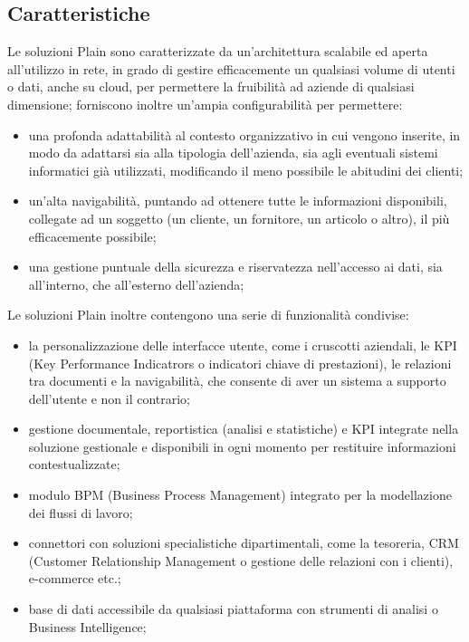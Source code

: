 \subsection{Caratteristiche}
Le soluzioni Plain sono caratterizzate da un'architettura scalabile ed aperta all'utilizzo in rete, in grado di gestire efficacemente un qualsiasi volume di utenti o dati, anche su cloud, per permettere la fruibilità ad aziende di qualsiasi dimensione; forniscono inoltre un'ampia configurabilità per permettere:
\begin{itemize}
	\item una profonda adattabilità al contesto organizzativo in cui vengono inserite, in modo da adattarsi sia alla tipologia dell'azienda, sia agli eventuali sistemi informatici già utilizzati, modificando il meno possibile le abitudini dei clienti;
	\item un'alta navigabilità, puntando ad ottenere tutte le informazioni disponibili, collegate ad un soggetto (un cliente, un fornitore, un articolo o altro), il più efficacemente possibile;
	\item una gestione puntuale della sicurezza e riservatezza nell'accesso ai dati, sia all'interno, che all'esterno dell'azienda;
\end{itemize}
Le soluzioni Plain inoltre contengono una serie di funzionalità condivise:
\begin{itemize}
	\item la personalizzazione delle interfacce utente, come i cruscotti aziendali, le KPI (Key Performance Indicatrors o indicatori chiave di prestazioni), le relazioni tra documenti e la navigabilità, che consente di aver un sistema a supporto dell'utente e non il contrario;
	\item gestione documentale, reportistica (analisi e statistiche) e KPI integrate nella soluzione gestionale e disponibili in ogni momento per restituire informazioni contestualizzate;
	\item modulo BPM (Business Process Management) integrato per la modellazione dei flussi di lavoro;
	\item connettori con soluzioni specialistiche dipartimentali, come la tesoreria, CRM (Customer Relationship Management o gestione delle relazioni con i clienti), e-commerce etc.;
	\item base di dati accessibile da qualsiasi piattaforma con strumenti di analisi o Business Intelligence;
\end{itemize}
